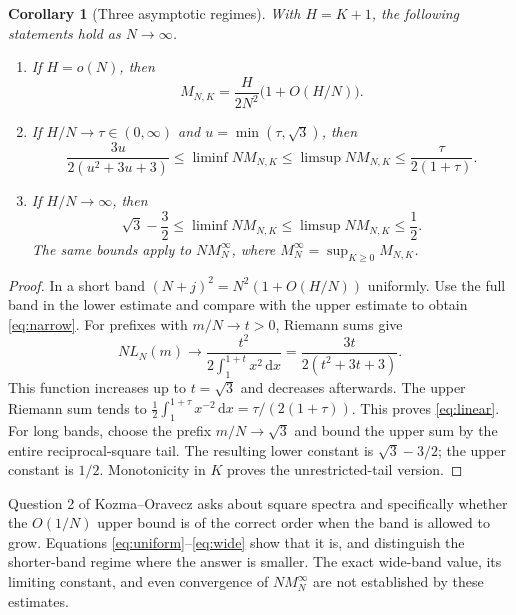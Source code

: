 \documentclass[11pt]{article}
\newtheorem{corollary}[theorem]{Corollary}
\theoremstyle{remark}\newtheorem{remark}[theorem]{Remark}
\newcommand{\dd}{\,\mathrm d}
\begin{document}
\begin{corollary}[Three asymptotic regimes]\label{cor:regimes}
With $H=K+1$, the following statements hold as $N\to\infty$.
\begin{enumerate}
\item If $H=o(N)$, then
\begin{equation}\label{eq:narrow}
 M_{N,K}=\frac{H}{2N^2}\bigl(1+O(H/N)\bigr).
\end{equation}
\item If $H/N\to\tau\in(0,\infty)$ and $u=\min(\tau,\sqrt3)$, then
\begin{equation}\label{eq:linear}
 \frac{3u}{2(u^2+3u+3)}
 \le\liminf NM_{N,K}\le\limsup NM_{N,K}
 \le\frac{\tau}{2(1+\tau)}.
\end{equation}
\item If $H/N\to\infty$, then
\begin{equation}\label{eq:wide}
 \sqrt3-\frac32\le\liminf NM_{N,K}
 \le\limsup NM_{N,K}\le\frac12.
\end{equation}
The same bounds apply to $N M_N^\infty$, where
$M_N^\infty=\sup_{K\ge0}M_{N,K}$.
\end{enumerate}
\end{corollary}

\begin{proof}
In a short band $(N+j)^2=N^2(1+O(H/N))$ uniformly. Use the full band in the
lower estimate and compare with the upper estimate to obtain \eqref{eq:narrow}.
For prefixes with $m/N\to t>0$, Riemann sums give
\[
 N L_N(m)\longrightarrow
 \frac{t^2}{2\int_1^{1+t}x^2\dd x}
 =\frac{3t}{2(t^2+3t+3)}.
\]
This function increases up to $t=\sqrt3$ and decreases afterwards. The
upper Riemann sum tends to
$\frac12\int_1^{1+\tau}x^{-2}\dd x=\tau/(2(1+\tau))$.
This proves \eqref{eq:linear}. For long bands, choose the prefix
$m/N\to\sqrt3$ and bound the upper sum by the entire reciprocal-square tail.
The resulting lower constant is $\sqrt3-3/2$; the upper constant is $1/2$.
Monotonicity in $K$ proves the unrestricted-tail version.
\end{proof}

Question 2 of Kozma--Oravecz \cite{KO} asks about square spectra and specifically
whether the $O(1/N)$ upper bound is of the correct order when the band is allowed
to grow. Equations \eqref{eq:uniform}--\eqref{eq:wide} show that it is, and
distinguish the shorter-band regime where the answer is smaller. The exact
wide-band value, its limiting constant, and even convergence of $NM_N^\infty$
are not established by these estimates.
\end{document}
